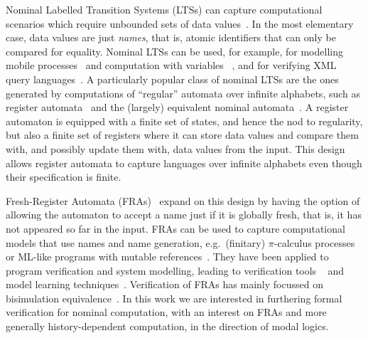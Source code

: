 Nominal Labelled Transition Systems (LTSs) can capture computational scenarios which
require unbounded sets of data values~\cite{automatanominalsets}.
In the most elementary case, data values are just \emph{names}, that is, atomic identifiers that can only be compared for equality. Nominal LTSs can be used,
for example, for modelling mobile processes~\cite{HDA1}
and computation with variables ~\cite{KAMINSKI1994329,GrumbergKS10}, and for verifying XML query languages~\cite{SCHWENTICK2007289}.
%
A particularly popular class of nominal LTSs are the ones generated by computations of ``regular'' automata over infinite alphabets, such as register automata~\cite{KAMINSKI1994329} and the (largely) equivalent nominal automata~\cite{automatanominalsets}. A register automaton is 
equipped with a finite set of states, and hence the nod to regularity, but also a finite set of registers where it can store data values and compare them with, and possibly update them with, data values from the input. This design allows register automata to capture languages over infinite alphabets even though their specification is finite.



Fresh-Register Automata (FRAs)~\cite{fra} expand on this design by having the option of allowing the automaton to accept a name just if it is globally fresh, that is, it has not appeared so far in the input.
FRAs
 can be used to capture computational models that use names and
name generation, e.g.\ (finitary) $\pi$-calculus processes~\cite{fra,DBLP:journals/jsa/BandukaraT23} or ML-like programs with mutable references~\cite{nominalgamesemantics}.
 They have been applied to program verification and system modelling, leading to verification tools ~\cite{imj,nominalgamesemantics,runtimeverira} and model learning techniques~\cite{RCDL,LearningRAFreshval}.
Verification of FRAs has mainly focussed on bisimulation equivalence~\cite{fra,BFRA,deqtheory}. In this work we are interested in furthering formal
verification for nominal computation, with an interest on FRAs and more generally history-dependent computation, in the direction of modal logics.


